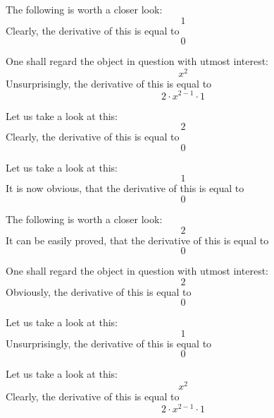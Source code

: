 \documentclass{article}
\begin{document}
The following is worth a closer look:
\begin{equation}
1 
\end{equation}
Clearly, the derivative of this is equal to
\begin{equation}
0 
\end{equation}

One shall regard the object in question with utmost interest:
\begin{equation}
x ^{2 } 
\end{equation}
Unsurprisingly, the derivative of this is equal to
\begin{equation}
2 \cdot x ^{2 - 1 } \cdot 1 
\end{equation}

Let us take a look at this:
\begin{equation}
2 
\end{equation}
Clearly, the derivative of this is equal to
\begin{equation}
0 
\end{equation}

Let us take a look at this:
\begin{equation}
1 
\end{equation}
It is now obvious, that the derivative of this is equal to
\begin{equation}
0 
\end{equation}

The following is worth a closer look:
\begin{equation}
2 
\end{equation}
It can be easily proved, that the derivative of this is equal to
\begin{equation}
0 
\end{equation}

One shall regard the object in question with utmost interest:
\begin{equation}
2 
\end{equation}
Obviously, the derivative of this is equal to
\begin{equation}
0 
\end{equation}

Let us take a look at this:
\begin{equation}
1 
\end{equation}
Unsurprisingly, the derivative of this is equal to
\begin{equation}
0 
\end{equation}

Let us take a look at this:
\begin{equation}
x ^{2 } 
\end{equation}
Clearly, the derivative of this is equal to
\begin{equation}
2 \cdot x ^{2 - 1 } \cdot 1 
\end{equation}
\end{document}
